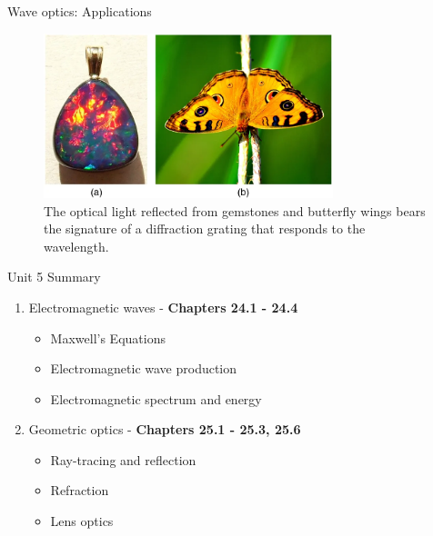 \documentclass{beamer}
\begin{document}
\begin{frame}{Wave optics: Applications}
\begin{figure}
\centering
\includegraphics[width=0.75\textwidth]{figures/slit10.png}
\caption{\label{fig:grating2} \footnotesize The optical light reflected from gemstones and butterfly wings bears the signature of a diffraction grating that responds to the wavelength.}
\end{figure}
\end{frame}

\begin{frame}{Unit 5 Summary}
\begin{enumerate}
\item Electromagnetic waves - \textbf{Chapters 24.1 - 24.4}
\begin{itemize}
\item Maxwell's Equations
\item Electromagnetic wave production
\item Electromagnetic spectrum and energy
\end{itemize}
\item Geometric optics - \textbf{Chapters 25.1 - 25.3, 25.6}
\begin{itemize}
\item Ray-tracing and reflection
\item Refraction
\item Lens optics
\end{itemize}
\end{enumerate}
\end{frame}
\end{document}
